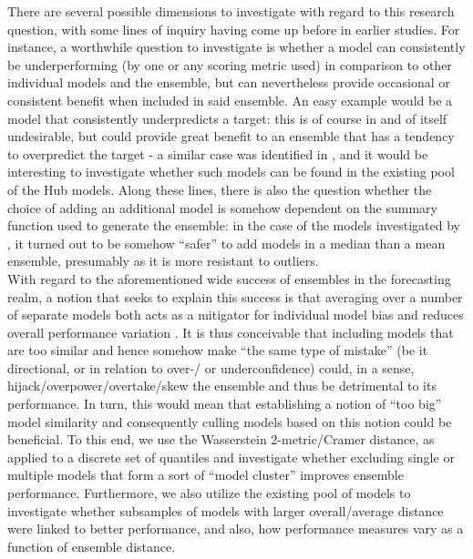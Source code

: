 There are several possible dimensions to investigate with regard to this research question, with some lines of inquiry having come up before in earlier studies. For instance, a worthwhile question to investigate is whether a model can consistently be underperforming (by one or any scoring metric used) in comparison to other individual models and the ensemble, but can nevertheless provide occasional or consistent benefit when included in said ensemble. An easy example would be a model that consistently underpredicts a target: this is of course in and of itself undesirable, but could provide great benefit to an ensemble that has a tendency to overpredict the target - a similar case was identified in \cite{bosse_comparing_2021}, and it would be interesting to investigate whether such models can be found in the existing pool of the Hub models. Along these lines, there is also the question whether the choice of adding an additional model is somehow dependent on the summary function used to generate the ensemble: in the case of the models investigated by \cite{bosse_comparing_2021}, it turned out to be somehow ``safer'' to add models in a median than a mean ensemble, presumably as it is more resistant to outliers. \\
With regard to the aforementioned wide success of ensembles in the forecasting realm, a notion that seeks to explain this success is that averaging over a number of separate models both acts as a mitigator for individual model bias and reduces overall performance variation . It is thus conceivable that including models that are too similar and hence somehow make ``the same type of mistake'' (be it directional, or in relation to over-/ or underconfidence) could, in a sense, hijack/overpower/overtake/skew the ensemble and thus be detrimental to its performance. In turn, this would mean that establishing a notion of ``too big''  model similarity and consequently culling models based on this notion could be beneficial. To this end, we use the Wasserstein 2-metric/Cramer distance, as applied to a discrete set of quantiles and investigate whether excluding single or multiple models that form a sort of ``model cluster'' improves ensemble performance. Furthermore, we also utilize the existing pool of models to investigate whether subsamples of models with larger overall/average distance were linked to better performance, and also, how performance measures vary as a function of ensemble distance.\\
